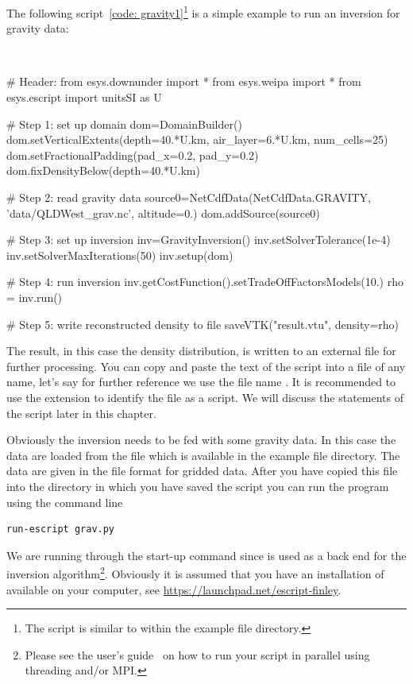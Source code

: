 The following script~\ref{code: gravity1}\footnote{The script is similar to
 within the \escript example file directory.} is a
simple example to run an inversion for gravity data:

\begin{pyc}\label{code: gravity1}
\
\begin{python}
# Header:
from esys.downunder import *
from esys.weipa import *
from esys.escript import unitsSI as U

# Step 1: set up domain
dom=DomainBuilder()
dom.setVerticalExtents(depth=40.*U.km, air_layer=6.*U.km, num_cells=25)
dom.setFractionalPadding(pad_x=0.2, pad_y=0.2)
dom.fixDensityBelow(depth=40.*U.km)

# Step 2: read gravity data
source0=NetCdfData(NetCdfData.GRAVITY, 'data/QLDWest_grav.nc', altitude=0.)
dom.addSource(source0)

# Step 3: set up inversion
inv=GravityInversion()
inv.setSolverTolerance(1e-4)
inv.setSolverMaxIterations(50)
inv.setup(dom)

# Step 4: run inversion 
inv.getCostFunction().setTradeOffFactorsModels(10.) 
rho = inv.run()

# Step 5: write reconstructed density to file
saveVTK("result.vtu", density=rho)
\end{python}
\end{pyc}
The result, in this case the density distribution, is written to an external
file for further processing. You can copy and paste the text of the script
into a file of any name, let's say for further reference we use the file
name \file{grav.py}.
It is recommended to use the extension  to identify the file as a
\Python script.
We will discuss the statements of the script later in this chapter. 

Obviously the inversion needs to be fed with some gravity data. In this case
the data are loaded from the file \examplefile{data/QLDWest_grav.nc} which is
available in the \escript example file directory.
The data are given in the \netcdf file format for gridded data.
After you have copied this file into the directory in which you have saved the
script \file{grav.py} you can run the program using the command line 
\begin{verbatim}
run-escript grav.py
\end{verbatim}
We are running  through the \escript start-up command since
\escript is used as a back end for the inversion algorithm\footnote{Please see
the \escript user's guide~\cite{ESCRIPT} on how to run your script in parallel
using threading and/or MPI.}.
Obviously it is assumed that you have an installation of \escript available on
your computer, see \url{https://launchpad.net/escript-finley}.

